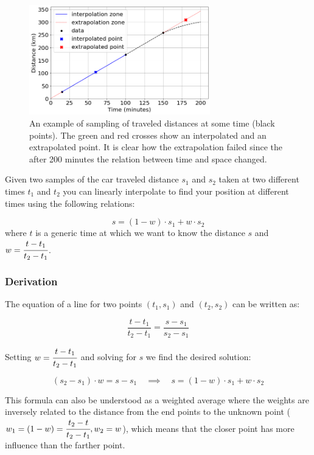 \begin{figure}
  \centering
  \includegraphics[width=0.7\textwidth]{figures/interp_example1.png}
  \caption{An example of sampling of traveled distances at some time (black points). The green and red crosses show an interpolated and an extrapolated point. It is clear how the extrapolation failed since the after 200 minutes the relation between time and space changed.}
  \label{fig:samples_for_interpolation}
\end{figure}

Given two samples of the car traveled distance \(s_1\) and \(s_2\) taken at two different times \(t_1\) and \(t_2\) you can linearly interpolate to find your position at different times using the following relations:

\begin{equation}
s = (1 - w)\cdot s_1 + w \cdot s_2
\end{equation}
where $t$ is a generic time at which we want to know the distance $s$ and \(w = \cfrac{t - t_1}{t_2 - t_1}\).

\begin{attention}
\subsubsection{Derivation}
The equation of a line for two points \((t_1, s_1)\) and \((t_2, s_2)\) can be written as:

\begin{equation}
\frac{t - t_1}{t_2 - t_1} = \frac{s - s_1}{s_2 - s_1}
\end{equation}

Setting \(w = \cfrac{t - t_1}{t_2 - t_1}\) and solving for \(s\) we find the desired solution:

\begin{equation}
(s_2 - s_1)\cdot w = s - s_1\quad\implies\quad s = (1 - w)\cdot s_1 + w \cdot s_2
\end{equation}

This formula can also be understood as a weighted average where the weights are inversely related to the distance from the end points to the unknown point ($w_1 = (1 - w) = \cfrac{t_2 - t}{t_2 -t_1}, w_2 = w$), which means that the closer point has more influence than the farther point.
\end{attention}

